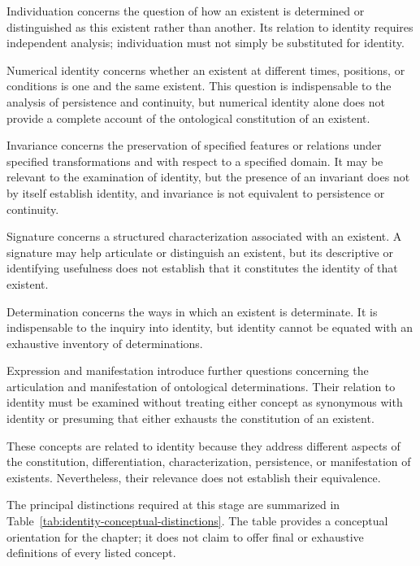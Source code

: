 Individuation concerns the question of how
an existent is determined or distinguished
as this existent rather than another. Its
relation to identity requires independent
analysis; individuation must not simply be
substituted for identity.

Numerical identity concerns whether an existent
at different times, positions, or conditions
is one and the same existent. This question
is indispensable to the analysis of persistence
and continuity, but numerical identity alone
does not provide a complete account of the
ontological constitution of an existent.

Invariance concerns the preservation of
specified features or relations under
specified transformations and with respect
to a specified domain. It may be relevant
to the examination of identity, but the
presence of an invariant does not by itself
establish identity, and invariance is not
equivalent to persistence or continuity.

Signature concerns a structured characterization
associated with an existent. A signature may
help articulate or distinguish an existent,
but its descriptive or identifying usefulness
does not establish that it constitutes the
identity of that existent.

Determination concerns the ways in which
an existent is determinate. It is indispensable
to the inquiry into identity, but identity
cannot be equated with an exhaustive inventory
of determinations.

Expression and manifestation introduce further
questions concerning the articulation and
manifestation of ontological determinations.
Their relation to identity must be examined
without treating either concept as synonymous
with identity or presuming that either exhausts
the constitution of an existent.

These concepts are related to identity because
they address different aspects of the constitution,
differentiation, characterization, persistence,
or manifestation of existents. Nevertheless,
their relevance does not establish their
equivalence.

The principal distinctions required at this
stage are summarized in Table~\ref{tab:identity-conceptual-distinctions}.
The table provides a conceptual orientation
for the chapter; it does not claim to offer
final or exhaustive definitions of every
listed concept.



